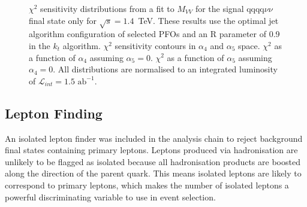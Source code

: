 \begin{figure}[h!]
\caption[$\chi^{2}$ sensitivity distributions from a fit to $M_{VV}$ for the signal $\text{qqqq}\nu\nu$ final state only for $\sqrt{s}=1.4$~TeV.  These results use the optimal jet algorithm configuration of selected PFOs and an R parameter of 0.9 in the $k_{t}$ algorithm.  \protect{} $\chi^{2}$ sensitivity contours in $\alpha_{4}$ and $\alpha_{5}$ space.  \protect{} $\chi^{2}$ as a function of $\alpha_{4}$ assuming $\alpha_{5} = 0$.  \protect{} $\chi^{2}$ as a function of $\alpha_{5}$ assuming $\alpha_{4} = 0$.  All distributions are normalised to an integrated luminosity of $\mathcal{L}_{int} = 1.5\text{ ab}^{-1}$.]{$\chi^{2}$ sensitivity distributions from a fit to $M_{VV}$ for the signal $\text{qqqq}\nu\nu$ final state only for $\sqrt{s}=1.4$~TeV.  These results use the optimal jet algorithm configuration of selected PFOs and an R parameter of 0.9 in the $k_{t}$ algorithm.  \protect{} $\chi^{2}$ sensitivity contours in $\alpha_{4}$ and $\alpha_{5}$ space.  \protect{} $\chi^{2}$ as a function of $\alpha_{4}$ assuming $\alpha_{5} = 0$.  \protect{} $\chi^{2}$ as a function of $\alpha_{5}$ assuming $\alpha_{4} = 0$.  All distributions are normalised to an integrated luminosity of $\mathcal{L}_{int} = 1.5\text{ ab}^{-1}$.}
\label{fig:allchi2jetalgoideal1400GeV}
\end{figure}


\subsection{Lepton Finding} 
\label{sec:isolatedleptonfinding}
An isolated lepton finder was included in the analysis chain to reject background final states containing primary leptons.  Leptons produced via hadronisation are unlikely to be flagged as isolated because all hadronisation products are boosted along the direction of the parent quark.  This means isolated leptons are likely to correspond to primary leptons, which makes the number of isolated leptons a powerful discriminating variable to use in event selection.  

